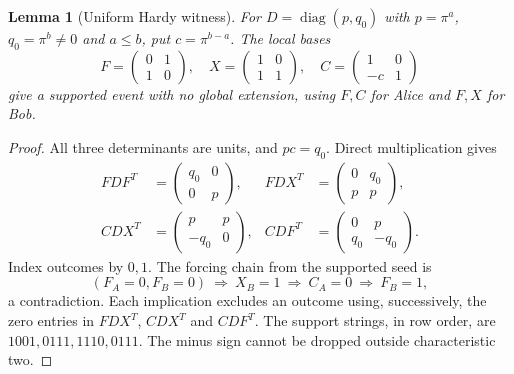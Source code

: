 \documentclass[11pt]{article}
\newtheorem{lemma}[theorem]{Lemma}
\theoremstyle{definition}\newtheorem{definition}[theorem]{Definition}
\theoremstyle{remark}\newtheorem{remark}[theorem]{Remark}
\DeclareMathOperator{\diag}{diag}
\begin{document}
\begin{lemma}[Uniform Hardy witness]\label{lem:hardy}
For $D=\diag(p,q_0)$ with $p=\pi^a$, $q_0=\pi^b\ne0$ and $a\leq b$, put $c=\pi^{b-a}$. The local bases
\[
 F=\begin{pmatrix}0&1\\1&0\end{pmatrix},\quad
 X=\begin{pmatrix}1&0\\1&1\end{pmatrix},\quad
 C=\begin{pmatrix}1&0\\-c&1\end{pmatrix}
\]
give a supported event with no global extension, using $F,C$ for Alice and $F,X$ for Bob.
\end{lemma}
\begin{proof}
All three determinants are units, and $pc=q_0$. Direct multiplication gives
\begin{align*}
 FDF^T&=\begin{pmatrix}q_0&0\\0&p\end{pmatrix},&
 FDX^T&=\begin{pmatrix}0&q_0\\p&p\end{pmatrix},\\
 CDX^T&=\begin{pmatrix}p&p\\-q_0&0\end{pmatrix},&
 CDF^T&=\begin{pmatrix}0&p\\q_0&-q_0\end{pmatrix}.
\end{align*}
Index outcomes by $0,1$. The forcing chain from the supported seed is
\[
(F_A=0,F_B=0)\ \Longrightarrow\ X_B=1
\ \Longrightarrow\ C_A=0\ \Longrightarrow\ F_B=1,
\]
a contradiction. Each implication excludes an outcome using, successively, the zero entries in $FDX^T$, $CDX^T$ and $CDF^T$. The support strings, in row order, are $1001,0111,1110,0111$. The minus sign cannot be dropped outside characteristic two.
\end{proof}
\end{document}
